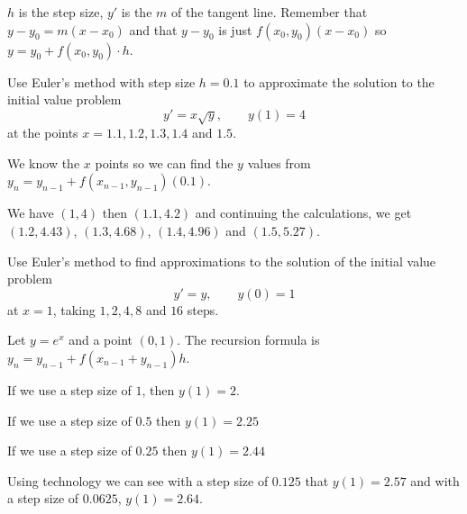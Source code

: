 \documentclass[../diffeq.tex]{subfiles}
\begin{document}
$h$ is the step size, $y'$ is the $m$ of the tangent line. Remember that $y-y_0=m(x-x_0)$ and that $y-y_0$ is just $f(x_0,y_0)(x-x_0)$ so $y=y_0+f(x_0,y_0)\cdot h$.

\pagebreak
\begin{example}
    Use Euler's method with step size $h=0.1$ to approximate the solution to the initial value problem 
    \[ y' = x\sqrt{y}, \qquad y(1)=4\]
    at the points $x=1.1,1.2,1.3,1.4$ and $1.5$.

    We know the $x$ points so we can find the $y$ values from $y_n=y_{n-1}+f(x_{n-1},y_{n-1})(0.1)$.

    We have $(1,4)$ then $(1.1,4.2)$ and continuing the calculations, we get $(1.2,4.43)$, $(1.3, 4.68)$, $(1.4, 4.96)$ and $(1.5,5.27)$.    
\end{example}

\begin{example}
    Use Euler's method to find approximations to the solution of the initial value problem 
    \[ y' = y, \qquad y(0)=1\]
    at $x=1$, taking $1,2,4,8$ and $16$ steps.

    Let $y=e^x$ and a point $(0,1)$. The recursion formula is $y_n=y_{n-1}+f(x_{n-1}+y_{n-1})h$.

    If we use a step size of $1$, then $y(1) =2$.

    If we use a step size of $0.5$ then $y(1) = 2.25$

    If we use a step size of $0.25$ then $y(1) = 2.44$

    Using technology we can see with a step size of $0.125$ that $y(1)=2.57$ and with a step size of $0.0625$, $y(1)=2.64$.    
\end{example}
\end{document}
